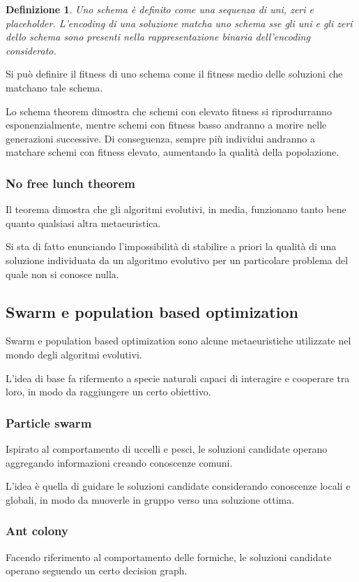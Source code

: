 \documentclass[a4paper]{article}
\newtheorem{definition}{Definizione}
\begin{document}
\begin{definition}
    Uno schema è definito come una sequenza di uni, zeri e placeholder.
    L'encoding di una soluzione matcha uno schema sse gli uni e gli zeri dello schema sono 
    presenti nella rappresentazione binaria dell'encoding considerato.
\end{definition}

Si può definire il fitness di uno schema come il fitness medio delle soluzioni che matchano tale
schema.

Lo schema theorem dimostra che schemi con elevato fitness si riprodurranno esponenzialmente, 
mentre schemi con fitness basso andranno a morire nelle generazioni successive.
Di conseguenza, sempre più individui andranno a matchare schemi con fitness elevato, aumentando
la qualità della popolazione.

\subsubsection{No free lunch theorem}
Il teorema dimostra che gli algoritmi evolutivi, in media, funzionano tanto bene quanto qualsiasi 
altra metaeuristica. 

Si sta di fatto enunciando l'impossibilità di stabilire a priori la qualità di una soluzione
individuata da un algoritmo evolutivo per un particolare problema del quale non si conosce nulla.

\subsection{Swarm e population based optimization}
Swarm e population based optimization sono alcune metaeuristiche utilizzate nel 
mondo degli algoritmi evolutivi.

L'idea di base fa rifermento a specie naturali capaci di interagire e cooperare tra 
loro, in modo da raggiungere un certo obiettivo.

\subsubsection{Particle swarm}
Ispirato al comportamento di uccelli e pesci, le soluzioni candidate operano aggregando 
informazioni creando conoscenze comuni.

L'idea è quella di guidare le soluzioni candidate considerando conoscenze locali e 
globali, in modo da muoverle in gruppo verso una soluzione ottima.

\subsubsection{Ant colony}
Facendo riferimento al comportamento delle formiche, le soluzioni candidate 
operano seguendo un certo decision graph. 
\end{document}
